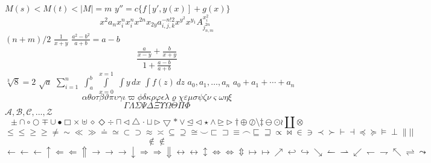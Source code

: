 \documentclass{article}
\begin{document}
	$M(s)<M(t)<|M|=m$
	$y''=c\{f[y',y(x)] + g(x)\}$
	\begin{displaymath}
		x^2 a_n x^n_i x_i^n
		x^{2n} x_{2y} a_{i,j,k}^{-n!2}
		x^{y^2} x^{y_1}
		A^{x_i^2}_{j^{2n}_{n,m}}
	\end{displaymath}
	$(n+m)/2$
	$\frac{1}{x+y}$
	$\frac{a^2 - b^2}{a+b} = a-b$
	\[ \frac{\frac{a}{x-y} + \frac{b}{x+y}}{1+\frac{a-b}{a+b}} \]
	$\sqrt[3]{8} = 2$
	$\sqrt{a}$
	$\sum_{i=1}^n$
	$\int_a^b$
	$\int\limits_{x=0}^{x=1}$
	$\int y\,dx$
	$\int f(z)\,dz$
	$a_0, a_1,\ldots,a_n$
	$a_0 + a_1 + \cdots + a_n$
	\begin{displaymath}
		\alpha \theta o \tau
		\beta \vartheta \pi \upsilon
		\gamma \iota \varpi \phi
		\delta \kappa \rho	\varphi
		\epsilon \lambda \varrho \chi
		\varepsilon \mu \sigma \psi
		\zeta \nu \varsigma \omega
		\eta \xi
	\end{displaymath}
	\begin{displaymath}
		\Gamma \Lambda \Sigma \Psi
		\Delta \Xi \Upsilon \Omega
		\Theta \Pi	\Phi
	\end{displaymath}
	$\mathcal{A, B, C,...,Z}$
	\begin{displaymath}
		\pm \cap \circ \bigcirc
		\mp \cup \bullet \Box
		\times \uplus \diamond \Diamond
		\div \sqcap \lhd \bigtriangleup
		\cdot \sqcup \rhd \bigtriangledown
		\ast \vee \unlhd \triangleleft
		\star \wedge \unrhd \triangleright
		\dagger \oplus \oslash \setminus
		\ddagger \ominus \odot \wr
		\amalg \otimes
	\end{displaymath}
	\begin{displaymath}
		\le \leq \ge \geq \neq \sim
		\ll \gg \doteq \simeq
		\subset \supset \approx \asymp
		\subseteq \supseteq \cong \smile
		\sqsubset \sqsupset \equiv \frown
		\sqsubseteq \sqsupseteq \propto \bowtie
		\in \ni \prec \succ
		\vdash \dashv \preceq \succeq
		\models \perp \parallel \mid |
	\end{displaymath}
	\begin{displaymath}
		\not\in \notin
	\end{displaymath}
	\begin{displaymath}
		\leftarrow \gets \longleftarrow \uparrow
		\Leftarrow \Longleftarrow \Uparrow
		\rightarrow \to \longrightarrow \downarrow
		\Rightarrow \Longrightarrow \Downarrow
		\leftrightarrow \longleftrightarrow \updownarrow
		\Leftrightarrow \Longleftrightarrow \Updownarrow
		\mapsto \longmapsto \nearrow
		\hookleftarrow \hookrightarrow \searrow
		\leftharpoonup \rightharpoonup \swarrow
		\leftharpoondown \rightharpoondown \nwarrow
		\rightleftharpoons \leadsto
	\end{displaymath}
\end{document}
